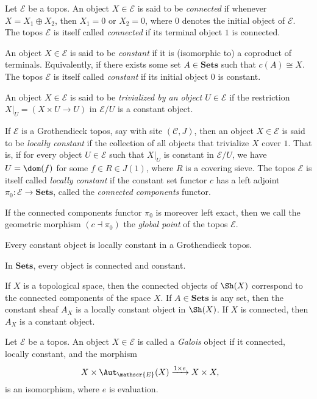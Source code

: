 \begin{definition}
Let $\mathscr{E}$ be a topos. An object $X \in \mathscr{E}$ is said to be \emph{connected} if whenever $X = X_1 \oplus X_2$, then $X_1 = 0$ or $X_2 = 0$, where $0$ denotes the initial object of $\mathscr{E}$. The topos $\mathscr{E}$ is itself called \emph{connected} if its terminal object $1$ is connected.

An object $X \in \mathscr{E}$ is said to be \emph{constant} if it is (isomorphic to) a coproduct of terminals. Equivalently, if there exists some set $A \in \mathbf{Sets}$ such that $c(A) \cong X$. The topos $\mathscr{E}$ is itself called \emph{constant} if its initial object $0$ is constant.

An object $X \in \mathscr{E}$ is said to be \emph{trivialized by an object $U \in \mathscr{E}$} if the restriction $X|_U = \left(X \times U \to U \right)$ in $\mathscr{E}/U$ is a constant object.

If $\mathscr{E}$ is a Grothendieck topos, say with site $(\mathcal{C},J)$, then an object $X \in \mathscr{E}$ is said to be \emph{locally constant} if the collection of all objects that trivialize $X$ cover $1$. That is, if for every object $U \in \mathscr{E}$ such that $X|_U$ is constant in $\mathscr{E}/U$, we have $U = \dom(f)$ for some $f \in R \in J(1)$, where $R$ is a covering sieve.
The topos $\mathscr{E}$ is itself called \emph{locally constant} if the constant set functor $c$ has a left adjoint $\pi_0 : \mathscr{E} \to \mathbf{Sets}$, called the \emph{connected components} functor.

If the connected components functor $\pi_0$ is moreover left exact, then we call the geometric morphism $(c \dashv \pi_0)$ the \emph{global point} of the topos $\mathscr{E}$.
\end{definition}

\begin{example}
Every constant object is locally constant in a Grothendieck topos.
\end{example}

\begin{example}
In $\mathbf{Sets}$, every object is connected and constant.
\end{example}

\begin{example}
If $X$ is a topological space, then the connected objects of $\Sh(X)$ correspond to the connected components of the space $X$. If $A \in \mathbf{Sets}$ is any set, then the constant sheaf $A_X$ is a locally constant object in $\Sh(X)$. If $X$ is connected, then $A_X$ is a constant object.
\end{example}

\begin{definition}
Let $\mathscr{E}$ be a topos. An object $X \in \mathscr{E}$ is called a \emph{Galois} object if it connected, locally constant, and the morphism
\[ X \times \Aut_{\mathscr{E}}(X) \xrightarrow{1 \times e} X \times X, \qquad \]
is an isomorphism, where $e$ is evaluation.
\end{definition}